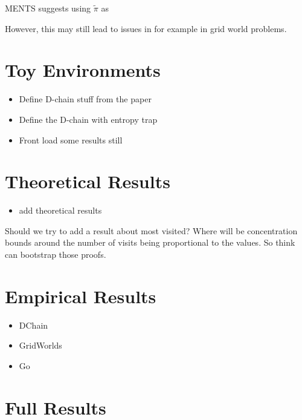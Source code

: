 


        MENTS suggests using $\tilde{\pi}$ as 

        However, this may still lead to issues in for example in grid world problems. 





\section{Toy Environments}
\label{sec:4-3-toyenvs}

    \begin{itemize}
        \item Define D-chain stuff from the paper
        \item Define the D-chain with entropy trap
        \item Front load some results still
    \end{itemize}

\section{Theoretical Results}
\label{sec:4-4-theory}

    \begin{itemize}
        \item add theoretical results
    \end{itemize}

    Should we try to add a result about most visited? Where will be concentration bounds around the number of visits being proportional to the values. So think can bootstrap those proofs.

\section{Empirical Results}
\label{sec:4-5-results}

    \begin{itemize}
        \item DChain
        \item GridWorlds
        \item Go
    \end{itemize}

\section{Full Results}
\label{sec:4-6-fullresults}

